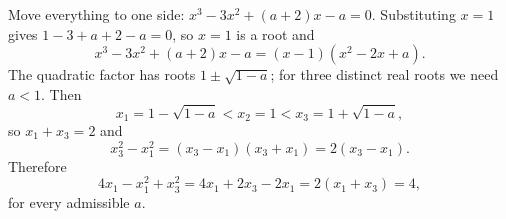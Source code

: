 Move everything to one side: $x^3-3x^2+(a+2)x-a=0$. Substituting $x=1$ gives $1-3+a+2-a=0$, so $x=1$ is a root and
\[
x^3-3x^2+(a+2)x-a=(x-1)\left(x^2-2x+a\right).
\]
The quadratic factor has roots $1\pm\sqrt{1-a}$; for three distinct real roots we need $a<1$. Then
\[
x_1=1-\sqrt{1-a}<x_2=1<x_3=1+\sqrt{1-a},
\]
so $x_1+x_3=2$ and
\[
x_3^2-x_1^2=(x_3-x_1)(x_3+x_1)=2(x_3-x_1).
\]
Therefore
\[
4x_1-x_1^2+x_3^2=4x_1+2x_3-2x_1=2(x_1+x_3)=\boxed{4},
\]
for every admissible $a$.
